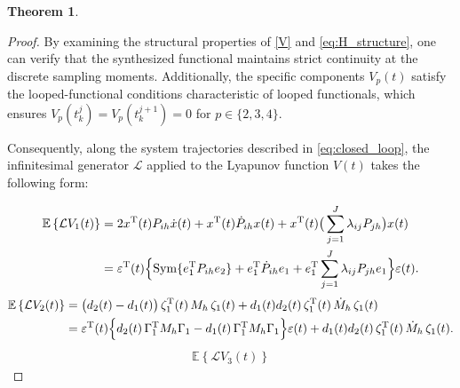 \documentclass[preprint,review,fleqn,sort&compress,3p]{elsarticle}
\theoremstyle{definition} %
\theoremstyle{definition}%
\newtheorem{thm}{Theorem}[section]
\begin{document}
\begin{thm}
\begin{proof}
			By examining the structural properties of \eqref{V} and \eqref{eq:H_structure}, one can verify that the synthesized functional maintains strict continuity at the discrete sampling moments. Additionally, the specific components $V_p(t)$ satisfy the looped-functional conditions characteristic of looped functionals, which ensures $V_p(t_k^j) = V_p(t_k^{j+1}) = 0$ for $p \in \{2, 3, 4\}$.
			
			Consequently, along the system trajectories described in \eqref{eq:closed_loop}, the infinitesimal generator $\mathcal{L}$ applied to the Lyapunov function $V(t)$ takes the following form:

			\begin{align}\label{EV1}
				\mathbb{E} \left\{ \mathcal{L}V_{1}(t) \right\}
				&= 2x^{\mathrm{T}}(t)P_{ih}\dot{x}(t) 
				+ x^{\mathrm{T}}(t)\dot{P}_{ih}x(t) 
				+ x^{\mathrm{T}}(t) \big( \sum_{j=1}^J \lambda_{ij}P_{jh} \big) x(t) \nonumber \\
				&= \varepsilon^{\mathrm{T}}(t) \Bigl\{ \mathrm{Sym}\{
				e_1^{\mathrm{T}}P_{ih}e_2\} + e_1^{\mathrm{T}}\dot{P}_{ih}e_1 
				+ e_1^{\mathrm{T}} \sum_{j=1}^J \lambda_{ij}P_{jh}e_1 \Bigl\} \varepsilon(t).
			\end{align}
			\begin{align}
				\mathbb{E} \left\{ \mathcal{L}V_{2}(t) \right\}
				&= \bigl(d_2(t) - d_1(t)\bigr) \, \zeta_1^{\mathrm{T}}(t) \, M_{h} \, \zeta_1(t) + d_1(t)d_2(t) \, \zeta_1^{\mathrm{T}}(t) \, \dot{M}_{h} \, \zeta_1(t) \nonumber \\
				&= \varepsilon^{\mathrm{T}}(t)
				\Bigl\{ d_2(t)\,\Gamma_{1}^{\mathrm{T}} M_{h} \Gamma_{1}
				- d_1(t)\,\Gamma_{1}^{\mathrm{T}} M_{h} \Gamma_{1} \Bigr\} \varepsilon(t)
				+ d_1(t)d_2(t) \, \zeta_1^{\mathrm{T}}(t) \, \dot{M}_{h} \, \zeta_1(t).
			\end{align}
			\begin{align}
				\mathbb{E} \left\{ \mathcal{L}V_{3}(t) \right\} 

\end{align}
\end{proof}
\end{thm}
\end{document}
